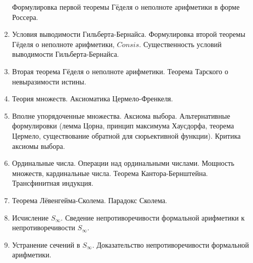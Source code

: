 \documentclass[12pt,a4paper,oneside]{scrartcl}
\begin{document}
\begin{enumerate}
Формулировка первой теоремы Гёделя о неполноте арифметики в форме Россера.
\item Условия выводимости Гильберта-Бернайса. Формулировка второй теоремы Гёделя о неполноте арифметики, 
$Consis$. Существенность условий выводимости Гильберта-Бернайса. 
\item Вторая теорема Гёделя о неполноте арифметики. Теорема Тарского о невыразимости истины.
\item Теория множеств. Аксиоматика Цермело-Френкеля.
\item Вполне упорядоченные множества. Аксиома выбора. Альтернативные формулировки (лемма Цорна, принцип 
максимума Хаусдорфа, теорема Цермело, существование обратной для сюрь\-ективной функции). Критика аксиомы выбора.
\item Ординальные числа. Операции над ординальными числами. Мощность множеств, кардинальные числа. Теорема
Кантора-Бернштейна. Трансфинитная индукция.
\item Теорема Лёвенгейма-Сколема. Парадокс Сколема.
\item Исчисление $S_\infty$. Сведение непротиворечивости формальной арифметики к не\-про\-ти\-воречивости $S_\infty$.
\item Устранение сечений в $S_\infty$. Доказательство непротиворечивости формальной арифметики.
\end{enumerate}
\end{document}
